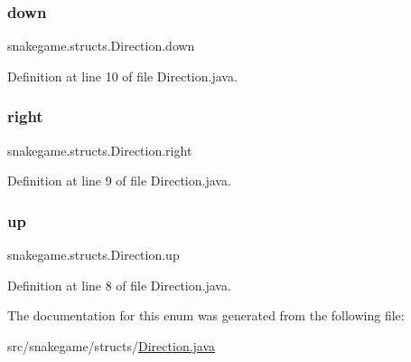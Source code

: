 \subsubsection{\texorpdfstring{down}{down}}
{\footnotesize\ttfamily snakegame.\+structs.\+Direction.\+down}



Definition at line 10 of file Direction.\+java.

\mbox{\label{enumsnakegame_1_1structs_1_1_direction_af5f078cc54af6fabd9325c39328c6d9c}} 
\subsubsection{\texorpdfstring{right}{right}}
{\footnotesize\ttfamily snakegame.\+structs.\+Direction.\+right}



Definition at line 9 of file Direction.\+java.

\mbox{\label{enumsnakegame_1_1structs_1_1_direction_a6eac992f122ba5b02aad12a7cfcf65ce}} 
\subsubsection{\texorpdfstring{up}{up}}
{\footnotesize\ttfamily snakegame.\+structs.\+Direction.\+up}



Definition at line 8 of file Direction.\+java.



The documentation for this enum was generated from the following file\+:\begin{DoxyCompactItemize}
\item 
src/snakegame/structs/\mbox{\hyperlink{_direction_8java}{Direction.\+java}}\end{DoxyCompactItemize}
